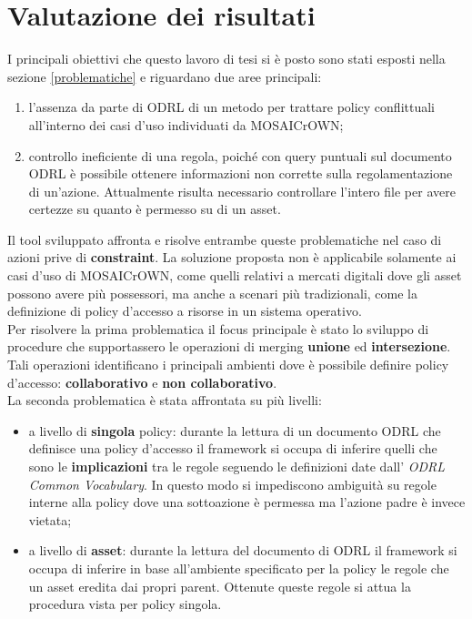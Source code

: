 \documentclass[12pt,a4paper,twoside]{book}
\begin{document}
\chapter{Valutazione dei risultati}
I principali obiettivi che questo lavoro di tesi si è posto sono stati esposti nella sezione \ref{problematiche} e riguardano due aree principali:
\begin{enumerate}
\item l'assenza da parte di ODRL di un metodo per trattare policy conflittuali all'interno dei casi d'uso individuati da MOSAICrOWN;
\item controllo ineficiente di una regola, poiché con query puntuali sul documento ODRL è possibile ottenere informazioni non corrette sulla regolamentazione di un'azione. Attualmente risulta necessario controllare l'intero file per avere certezze su quanto è permesso su di un asset.
\end{enumerate}
Il tool sviluppato affronta e risolve entrambe queste problematiche nel caso di azioni prive di \textbf{constraint}. La soluzione proposta non è applicabile solamente ai casi d'uso di MOSAICrOWN, come quelli relativi a mercati digitali dove gli asset possono avere più possessori, ma anche a scenari più tradizionali, come la definizione di policy d'accesso a risorse in un sistema operativo.\\
Per risolvere la prima problematica il focus principale è stato lo sviluppo di procedure che supportassero le operazioni di merging \textbf{unione} ed \textbf{intersezione}. Tali operazioni identificano i principali ambienti dove è possibile definire policy d'accesso: \textbf{collaborativo} e \textbf{non collaborativo}.\\
La seconda problematica è stata affrontata su più livelli:
\begin{itemize}
\item a livello di \textbf{singola} policy: durante la lettura di un documento ODRL che definisce una policy d'accesso il framework si occupa di inferire quelli che sono le \textbf{implicazioni} tra le regole seguendo le definizioni date dall' \textit{ODRL Common Vocabulary}. In questo modo si impediscono ambiguità su regole interne alla policy dove una sottoazione è permessa ma l'azione padre è invece vietata;
\item a livello di \textbf{asset}: durante la lettura del documento di ODRL il framework si occupa di inferire in base all'ambiente specificato per la policy le regole che un asset eredita dai propri parent. Ottenute queste regole si attua la procedura vista per policy singola.
\end{itemize}
\end{document}
